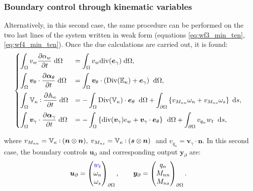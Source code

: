 \documentclass[preprint,12pt]{elsarticle}
\newcommand{\secondReviewer}[1]{\textcolor{blue!80!black}{#1}}
\def\onedot{$\mathsurround0pt\ldotp$}
\def\cddot{%
	\mathbin{\vcenter{\baselineskip.67ex
			\hbox{\onedot}\hbox{\onedot}}%
}}
\begin{document}
\subsubsection{Boundary control through kinematic variables}
Alternatively, in this second case, the same procedure can be performed on the two last lines of the system written in weak form (equations \eqref{eq:wf3_min_ten}, \eqref{eq:wf4_min_ten}). Once the due calculations are carried out, it is found:
\begin{equation}
\label{eq:WF_Min_Kin}
\begin{cases}
\displaystyle\int_{\Omega} v_w \diffp{\alpha_w}{t}  \d\Omega  &= \displaystyle \int_{\Omega} v_w \mathrm{div}(\bm{e}_{\gamma})  \d\Omega, \vspace{2mm}\\
\displaystyle\int_{\Omega} \bm{v}_{\theta} \cdot \diffp{\bm\alpha_{\theta}}{t}   \d\Omega &= \displaystyle \int_{\Omega} \bm{v}_{\theta} \cdot (\mathrm{Div}(\mathbb{E}_{\kappa}) + \bm{e}_{\gamma}) \;  \d\Omega, \vspace{2mm} \\
\displaystyle\int_{\Omega} \mathbb{V}_{\kappa} \cddot \diffp{\mathbb{A}_{\kappa}}{t}   \d\Omega &= - \displaystyle\int_{\Omega} \mathrm{Div}(\mathbb{V}_{\kappa}) \cdot \bm{e}_\theta \;  \d\Omega +  \displaystyle\int_{\partial \Omega} \left\{ v_{M_{nn}} \omega_{n} + v_{M_{ns}} \omega_{s} \right\}  \d{s}, \vspace{2mm} \\
\displaystyle\int_{\Omega} \bm{v}_{\gamma} \cdot \diffp{\bm\alpha_{\gamma}}{t}   \d\Omega &=  - \displaystyle\int_{\Omega} \left\{ \mathrm{div}(\bm{v}_{\gamma}) e_w + \bm{v}_{\gamma} \cdot \bm{e}_{\theta} \right\} \, \d\Omega + \displaystyle\int_{\partial \Omega} v_{q_{n}} w_t \;  \d{s},
\end{cases}
\end{equation}

where $v_{M_{nn}} = \mathbb{V}_{\kappa} \cddot (\bm{n} \otimes \bm{n}), \;  v_{M_{ns}} = \mathbb{V}_{\kappa} \cddot (\bm{s} \otimes \bm{n}) \;$ and $v_{q_n} = \bm{v}_{\gamma} \cdot \bm{n}$.
In this second case,  the boundary controls $\bm{u}_\partial$ and corresponding output $\bm{y}_\partial$ are:
\[\bm{u}_\partial = 
\begin{pmatrix}
\secondReviewer{w_t} \\
\omega_{n} \\
\omega_{s} \\
\end{pmatrix}_{\partial \Omega}, \qquad
\bm{y}_\partial = 
\begin{pmatrix}
q_n \\
M_{nn} \\
M_{ns} \\
\end{pmatrix}_{\partial \Omega}.
\]
\end{document}
